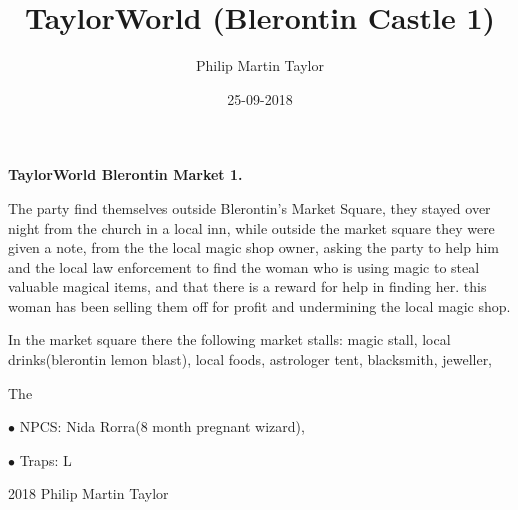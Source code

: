 \documentclass[12pt,a4paper]{book}
\date{25-09-2018}
\author{Philip Martin Taylor}
\title{TaylorWorld (Blerontin Castle 1)}
\begin{document}
\begin{center}
\textbf{TaylorWorld\texttrademark \: Blerontin Market 1.}
\end{center}
\begin{flushleft}
  The party find themselves outside Blerontin's Market Square, they stayed over night from the church in a local inn, while outside the market square they were given a note, from the the local magic shop owner, asking the party to help him and the local law enforcement to find the woman who is using magic to steal valuable magical items, and that there is a reward for help in finding her. this woman has been selling them off for profit and undermining the local magic shop. 
\end{flushleft}
\begin{flushleft}
  In the market square there the following market stalls: magic stall, local drinks(blerontin lemon blast), local foods, astrologer tent, blacksmith, jeweller, 
\end{flushleft}
\begin{flushleft}
  The
\end{flushleft}
\begin{flushleft}
\item[$\bullet$ NPCS:] Nida Rorra(8 month pregnant wizard),
  \item[$\bullet$ Traps:] L
\end{flushleft}
\begin{center}
  \textcopyright{} 2018 Philip Martin Taylor
\end{center}
\end{document}
